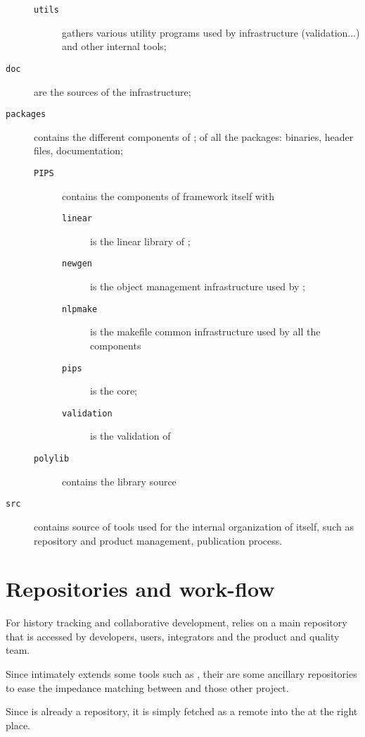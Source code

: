 \documentclass[a4paper]{article}
\begin{document}
\begin{description}
\begin{description}
  \item[\texttt{utils}] gathers various utility programs used by \Apfa
    infrastructure (validation...) and other internal tools;
  \end{description}
\item[\texttt{doc}] are the sources of the \Apfa infrastructure;
\item[\texttt{packages}] contains the different components of \Apfa; of
  all the \Apfa packages: binaries, header files, documentation;
  \begin{description}
  \item[\texttt{PIPS}] contains the components of \Apips framework itself
    with
    \begin{description}
    \item[\texttt{linear}] is the \Apips linear library of \Apips;
    \item[\texttt{newgen}] is the object management infrastructure used by
      \Apips;
    \item[\texttt{nlpmake}] is the makefile common infrastructure used by
      all the \Apips components
    \item[\texttt{pips}] is the \Apips core;
    \item[\texttt{validation}] is the validation of \Apips
    \end{description}
  \item[\texttt{polylib}] contains the \Apolylib library source
  \end{description}
\item[\texttt{src}] contains source of tools used for the internal
  organization of \Apfa itself, such as repository and product management,
  publication process.
\end{description}


\section{Repositories and work-flow}
\label{sec:repos-workfl}

For history tracking and collaborative development, \Apfa relies on a main
\Agit repository that is accessed by \Apfa developers, users, integrators
and the product and quality team.

Since \Apfa intimately extends some tools such as \Apips, their are some
ancillary repositories to ease the impedance matching between \Apfa and
those other project.

Since \Apolylib is already a \Agit repository, it is simply fetched as a
remote \Agit into the \Apfa at the right place.
\end{document}
